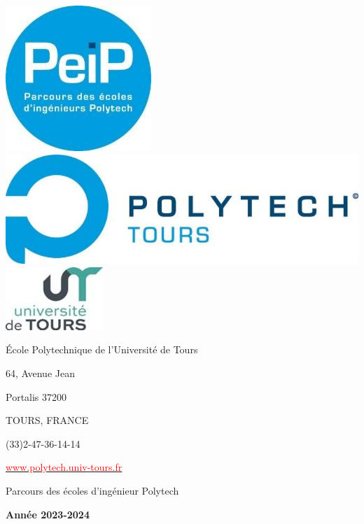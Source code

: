 \documentclass[12pt]{scrreprt} %
\begin{document}

\begin{titlepage}

    \noindent\includegraphics{0.jpg}
    \includegraphics{1.jpg}
    \hfill
    \includegraphics{2.jpg}
    \vspace{1cm}


    École Polytechnique de l'Université de Tours

    64, Avenue Jean

    Portalis 37200

    TOURS, FRANCE

    (33)2-47-36-14-14

    \href{http://www.polytech.univ-tours.fr}{\textcolor{red}{www.polytech.univ-tours.fr}}


    \vfill
    \begin{center}

        \Huge
        Parcours des écoles d'ingénieur Polytech
        \vspace{0.3cm}

        \textbf{Année 2023-2024}
        \vspace{0.5cm}



\end{center}
\end{titlepage}
\end{document}

